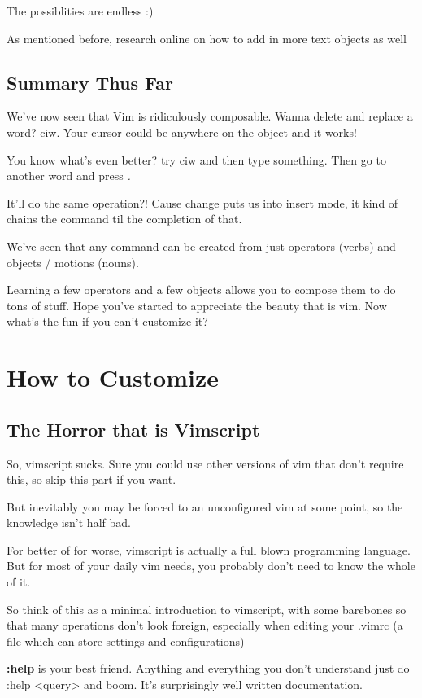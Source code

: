 \documentclass[12pt, letterpaper]{article}
\begin{document}
The possiblities are endless :)

As mentioned before, research online on how to add in more text objects as well

\subsection{Summary Thus Far}

We've now seen that Vim is ridiculously composable. Wanna delete and replace a word? ciw. Your cursor could be anywhere on the object and it works!

You know what's even better? try ciw and then type something. Then go to another word and press \textit{.}

It'll do the same operation?! Cause change puts us into insert mode, it kind of chains the command til the completion of that. 

We've seen that any command can be created from just operators (verbs) and objects / motions (nouns). 

Learning a few operators and a few objects allows you to compose them to do tons of stuff. Hope you've started to appreciate the beauty that is vim. Now what's the fun if you can't customize it?

\section{How to Customize}
\subsection{The Horror that is Vimscript}
So, vimscript sucks. Sure you could use other versions of vim that don't require this, so skip this part if you want.

But inevitably you may be forced to an unconfigured vim at some point, so the knowledge isn't half bad.

For better of for worse, vimscript is actually a full blown programming language. But for most of your daily vim needs, you probably don't need to know the whole of it. 

So think of this as a minimal introduction to vimscript, with some barebones so that many operations don't look foreign, especially when editing your .vimrc (a file which can store settings and configurations)

\textbf{:help} is your best friend. Anything and everything you don't understand just do :help <query> and boom. It's surprisingly well written documentation.
\end{document}
